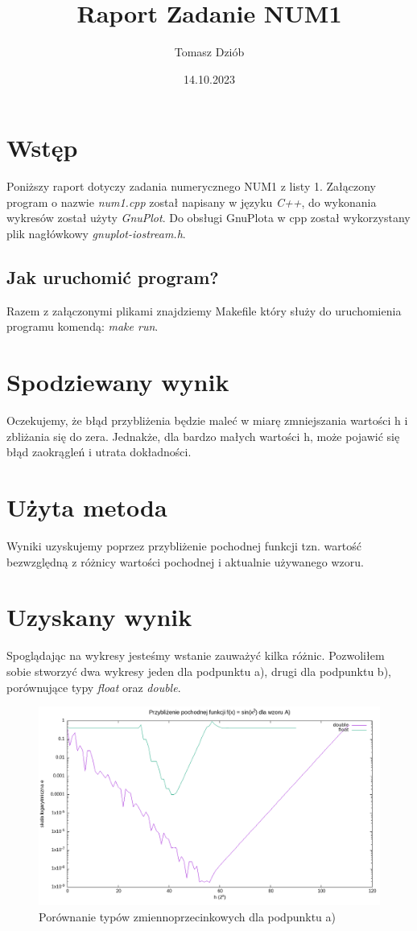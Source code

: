 \documentclass{article}
\title{Raport Zadanie NUM1}
\date{14.10.2023}
\author{Tomasz Dziób}
\begin{document}
  \maketitle
  \newpage
  \section{Wstęp}
  Poniższy raport dotyczy zadania numerycznego NUM1 z listy 1.
Załączony program o nazwie \textit{num1.cpp} został napisany w języku \textit{C++}, do wykonania
  wykresów został użyty \textit{GnuPlot}. Do obsługi GnuPlota w cpp został 
  wykorzystany plik nagłówkowy \textit{gnuplot-iostream.h}.
    \subsection{Jak uruchomić program?}
    Razem z załączonymi plikami znajdziemy Makefile który służy do
    uruchomienia programu komendą: \textit{make run}.
  \section{Spodziewany wynik}
   Oczekujemy, że błąd przybliżenia będzie maleć w miarę zmniejszania wartości
   h i zbliżania się do zera. Jednakże, dla bardzo małych wartości h, może 
   pojawić się błąd zaokrągleń i utrata dokładności.

  \section{Użyta metoda}
  Wyniki uzyskujemy poprzez przybliżenie pochodnej funkcji tzn.
  wartość bezwzględną z różnicy wartości pochodnej i
  aktualnie używanego wzoru.

  \section{Uzyskany wynik}
  Spoglądając na wykresy jesteśmy wstanie zauważyć kilka różnic. Pozwoliłem sobie
  stworzyć dwa wykresy jeden dla podpunktu a), drugi dla podpunktu b), porównujące
  typy \textit{float} oraz \textit{double}.

  \begin{figure}[!ht]
      \includegraphics[width=\linewidth]{wyniki_A.png}
      \caption{Porównanie typów zmiennoprzecinkowych dla podpunktu a)}
    \end{figure}
\end{document}
